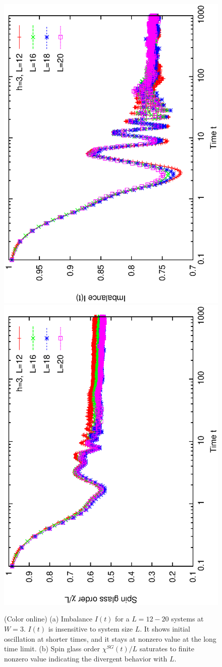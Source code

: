\documentclass[prl,aps,epsf,showpacs,twocolumn,letterpaper]{revtex4}
\begin{document}
\begin{figure}[h]
	\centering
	\includegraphics[angle=-90,width=0.95\linewidth]{newfig3a.ps}\\ \includegraphics[angle=-90,width=0.92\linewidth]{newfig3b.ps}\\
	\caption{
		(Color online) 
		 (a) Imbalance $I(t)$ for a $L=12-20$ systems at $W=3$. $I(t)$ is insensitive to system size $L$.  It 
shows initial oscillation at shorter times, and it stays at nonzero
value at the long time limit.   (b) Spin glass order $\chi^{SG}(t)/L$ saturates to finite nonzero value indicating the divergent 
behavior with $L$. }
	\label{fig4}
\end{figure}


\end{document}

